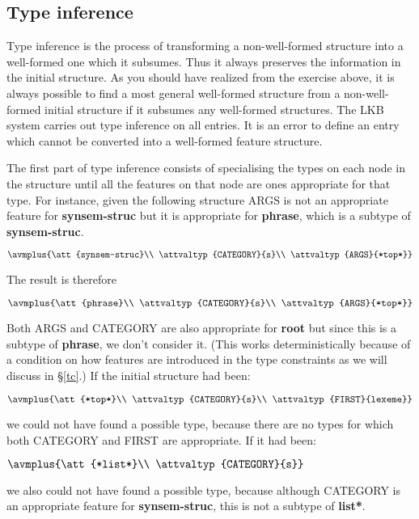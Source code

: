\documentclass[12pt]{report}
\begin{document}
\subsection{Type inference}

Type inference is the process of transforming a non-well-formed
structure into a well-formed one which it subsumes.  Thus
it always preserves the information in the initial structure.
As you should have realized from the exercise
above, it is always possible to find a most general
well-formed structure from a non-well-formed initial structure
if it subsumes any well-formed structures.
The LKB system carries
out type inference on all entries.  It is an error to
define an entry which cannot be converted into a well-formed 
feature structure.  

The first part of type inference consists of specialising
the types on each node in the structure until all the features on that
node are ones appropriate for that type.
For instance, given the following structure
ARGS is not an appropriate feature for {\bf synsem-struc}
but it is appropriate for {\bf phrase}, which is a subtype of 
{\bf synsem-struc}.  
\begin{ex}
{\tiny $\avmplus{\att{synsem-struc}\\
\attvaltyp{CATEGORY}{s}\\
\attvaltyp{ARGS}{*top*}}$}
\end{ex}
The result is therefore
\begin{ex}
{\tiny $\avmplus{\att{phrase}\\
\attvaltyp{CATEGORY}{s}\\
\attvaltyp{ARGS}{*top*}}$}
\end{ex}
Both ARGS and CATEGORY are also appropriate for {\bf root}
but since this is a subtype of {\bf phrase}, we don't consider it.
(This works deterministically because of a condition on
how features are introduced in the type constraints
as we will discuss in \S\ref{tc}.)  If the initial structure had been:
\begin{ex}
{\tiny $\avmplus{\att{*top*}\\
\attvaltyp{CATEGORY}{s}\\
\attvaltyp{FIRST}{lexeme}}$}
\end{ex}
we could not have found a possible type, because there are
no types for which both CATEGORY and FIRST are appropriate.
If it had been:
\begin{ex}
{\tiny $\avmplus{\att{*list*}\\
\attvaltyp{CATEGORY}{s}}$}
\end{ex}
we also could not have found a possible type, because
although CATEGORY is an appropriate feature for {\bf synsem-struc},
this is not a subtype of {\bf *list*}.
\end{document}
